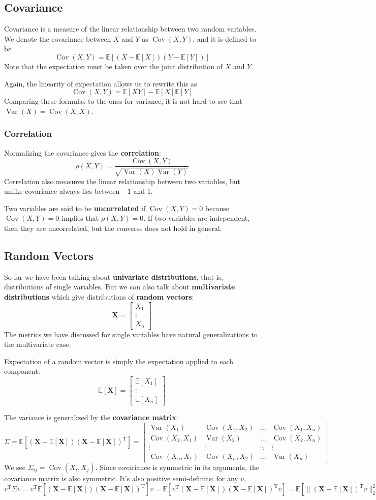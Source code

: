 \documentclass{article}
\newcommand{\mat}[1]{\begin{bmatrix}#1\end{bmatrix}}
\newcommand{\tran}{^\text{T}}
\newcommand{\ev}[1]{\mathbb{E}[#1]}
\newcommand{\var}[1]{\operatorname{Var}(#1)}
\newcommand{\cov}[2]{\operatorname{Cov}(#1, #2)}
\newcommand{\bX}{\mathbf{X}}
\newcommand{\term}[1]{\textbf{#1}}
\begin{document}
\subsection{Covariance}
Covariance is a measure of the linear relationship between two random variables. We denote the covariance between $X$ and $Y$ as $\cov{X}{Y}$, and it is defined to be
\[\cov{X}{Y} = \ev{(X-\ev{X})(Y-\ev{Y})}\]
Note that the expectation must be taken over the joint distribution of $X$ and $Y$.

Again, the linearity of expectation allows us to rewrite this as
\[\cov{X}{Y} = \ev{XY} - \ev{X}\ev{Y}\]
Comparing these formulas to the ones for variance, it is not hard to see that $\var{X} = \cov{X}{X}$.

\subsubsection{Correlation}
Normalizing the covariance gives the \term{correlation}:
\[\rho(X, Y) = \frac{\cov{X}{Y}}{\sqrt{\var{X}\var{Y}}}\]
Correlation also measures the linear relationship between two variables, but unlike covariance always lies between $-1$ and $1$.

Two variables are said to be \term{uncorrelated} if $\cov{X}{Y} = 0$ because $\cov{X}{Y} = 0$ implies that $\rho(X, Y) = 0$. If two variables are independent, then they are uncorrelated, but the converse does not hold in general.

\subsection{Random Vectors}
So far we have been talking about \term{univariate distributions}, that is, distributions of single variables. But we can also talk about \term{multivariate distributions} which give distributions of \term{random vectors}:
\[\bX = \mat{X_1 \\ \vdots \\ X_n}\]
The metrics we have discussed for single variables have natural generalizations to the multivariate case.

Expectation of a random vector is simply the expectation applied to each component:
\[\ev{\bX} = \mat{\ev{X_1} \\ \vdots \\ \ev{X_n}}\]

The variance is generalized by the \term{covariance matrix}:
\[\Sigma = \ev{(\bX - \ev{\bX})(\bX - \ev{\bX})\tran} = \mat{
\var{X_1} & \cov{X_1}{X_2} & \hdots & \cov{X_1}{X_n} \\
\cov{X_2}{X_1} & \var{X_2} & \hdots & \cov{X_2}{X_n} \\
\vdots & \vdots & \ddots & \vdots \\
\cov{X_n}{X_1} & \cov{X_n}{X_2} & \hdots & \var{X_n}
}\]
We see $\Sigma_{ij} = \cov{X_i}{X_j}$. Since covariance is symmetric in its arguments, the covariance matrix is also symmetric. It's also positive semi-definite: for any $v$,
\[v\tran\Sigma v = v\tran\ev{(\bX - \ev{\bX})(\bX - \ev{\bX})\tran}v = \ev{v\tran(\bX - \ev{\bX})(\bX - \ev{\bX})\tran v} = \ev{\|(\bX - \ev{\bX})\tran v\|_2^2} \geq 0\]
\end{document}
